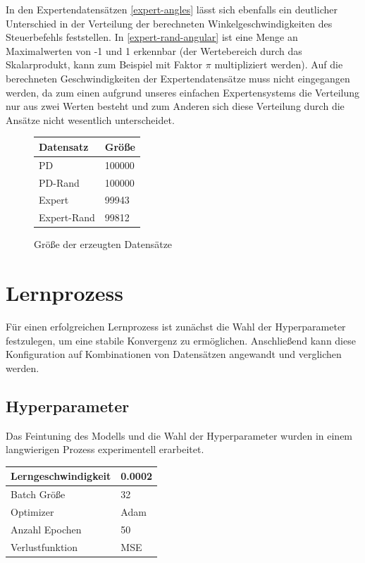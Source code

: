In den Expertendatensätzen \ref{expert-angles} lässt sich ebenfalls ein deutlicher Unterschied in der Verteilung der berechneten Winkelgeschwindigkeiten des Steuerbefehls feststellen. In \ref{expert-rand-angular} ist eine Menge an Maximalwerten von -1 und 1 erkennbar (der Wertebereich durch das Skalarprodukt, kann zum Beispiel mit Faktor $\pi$ multipliziert werden).
Auf die berechneten Geschwindigkeiten der Expertendatensätze muss nicht eingegangen werden, da zum einen aufgrund unseres einfachen Expertensystems die Verteilung nur aus zwei Werten besteht und zum Anderen sich diese Verteilung durch die Ansätze nicht wesentlich unterscheidet.\\

\begin{figure}[H]
	\centering
	\begin{tabular}[t]{|l|l|}
		\hline
		\textbf{Datensatz} & \textbf{Größe} \\
		\hline
		PD & 100000 \\
		\hline
		PD-Rand & 100000 \\
		\hline
		Expert & 99943 \\
		\hline
		Expert-Rand & 99812 \\
		\hline
	\end{tabular}
	\caption{Größe der erzeugten Datensätze}
\end{figure}

\section{Lernprozess}

Für einen erfolgreichen Lernprozess ist zunächst die Wahl der Hyperparameter festzulegen, um eine stabile Konvergenz zu ermöglichen. Anschließend kann diese Konfiguration auf Kombinationen von Datensätzen angewandt und verglichen werden.

\subsection{Hyperparameter}

Das Feintuning des Modells und die Wahl der Hyperparameter wurden in einem langwierigen Prozess experimentell erarbeitet.
\newpage
\begin{center}
	\begin{tabular}[t]{|l|l|}
		\hline
		Lerngeschwindigkeit & 0.0002 \\
		\hline
		Batch Größe & 32 \\
		\hline
		Optimizer & Adam \\
		\hline
		Anzahl Epochen & 50 \\
		\hline
		Verlustfunktion & MSE \\
		\hline
	\end{tabular}
\end{center}


